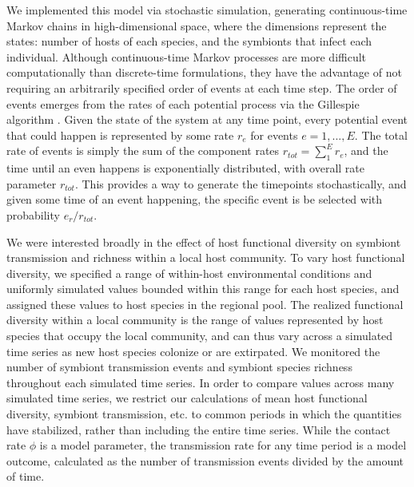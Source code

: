 We implemented this model via stochastic simulation, generating continuous-time Markov chains in high-dimensional space, where the dimensions represent the states: number of hosts of each species, and the symbionts that infect each individual.
Although continuous-time Markov processes are more difficult computationally than discrete-time formulations, they have the advantage of not requiring an arbitrarily specified order of events at each time step.
The order of events emerges from the rates of each potential process via the Gillespie algorithm \citep{Gillespie1976}.
Given the state of the system at any time point, every potential event that could happen is represented by some rate $r_e$ for events $e = 1, ..., E$.
The total rate of events is simply the sum of the component rates $r_{tot} = \sum_{1}^{E} r_e$, and the time until an even happens is exponentially distributed, with overall rate parameter $r_{tot}$.
This provides a way to generate the timepoints stochastically, and given some time of an event happening, the specific event is be selected with probability $e_r / r_{tot}$.

We were interested broadly in the effect of host functional diversity on symbiont transmission and richness within a local host community.
To vary host functional diversity, we specified a range of within-host environmental conditions and uniformly simulated values bounded within this range for each host species, and assigned these values to host species in the regional pool.
The realized functional diversity within a local community is the range of values represented by host species that occupy the local community, and can thus vary across a simulated time series as new host species colonize or are extirpated.
We monitored the number of symbiont transmission events and symbiont species richness throughout each simulated time series.
In order to compare values across many simulated time series, we restrict our calculations of mean host functional diversity, symbiont transmission, etc. to common periods in which the quantities have stabilized, rather than including the entire time series.
While the contact rate $\phi$ is a model parameter, the transmission rate for any time period is a model outcome, calculated as the number of transmission events divided by the amount of time.

